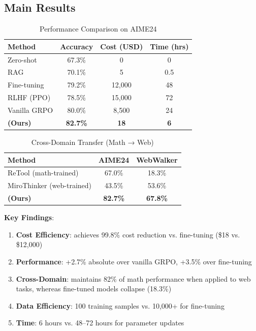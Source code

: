 \subsection{Main Results}

\begin{table}[t]
\centering
\caption{Performance Comparison on AIME24}
\label{tab:results-aime}
\begin{tabular}{lccc}
\toprule
\textbf{Method} & \textbf{Accuracy} & \textbf{Cost (USD)} & \textbf{Time (hrs)} \\
\midrule
Zero-shot & 67.3\% & 0 & 0 \\
RAG & 70.1\% & 5 & 0.5 \\
Fine-tuning & 79.2\% & 12,000 & 48 \\
RLHF (PPO) & 78.5\% & 15,000 & 72 \\
Vanilla GRPO & 80.0\% & 8,500 & 24 \\
\textbf{\DSO{} (Ours)} & \textbf{82.7\%} & \textbf{18} & \textbf{6} \\
\bottomrule
\end{tabular}
\end{table}

\begin{table}[t]
\centering
\caption{Cross-Domain Transfer (Math → Web)}
\label{tab:transfer}
\begin{tabular}{lcc}
\toprule
\textbf{Method} & \textbf{AIME24} & \textbf{WebWalker} \\
\midrule
ReTool (math-trained) & 67.0\% & 18.3\% \\
MiroThinker (web-trained) & 43.5\% & 53.6\% \\
\textbf{\DSO{} (Ours)} & \textbf{82.7\%} & \textbf{67.8\%} \\
\bottomrule
\end{tabular}
\end{table}

\textbf{Key Findings}:

\begin{enumerate}
    \item \textbf{Cost Efficiency}: \DSO{} achieves 99.8\% cost reduction vs. fine-tuning (\$18 vs. \$12,000)
    
    \item \textbf{Performance}: +2.7\% absolute over vanilla GRPO, +3.5\% over fine-tuning
    
    \item \textbf{Cross-Domain}: \DSO{} maintains 82\% of math performance when applied to web tasks, whereas fine-tuned models collapse (18.3\%)
    
    \item \textbf{Data Efficiency}: 100 training samples vs. 10,000+ for fine-tuning
    
    \item \textbf{Time}: 6 hours vs. 48--72 hours for parameter updates
\end{enumerate}


